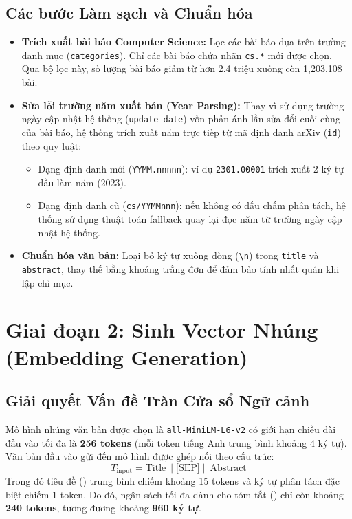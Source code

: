 \subsection{Các bước Làm sạch và Chuẩn hóa}
\begin{itemize}
    \item \textbf{Trích xuất bài báo Computer Science:} Lọc các bài báo dựa trên trường danh mục (\texttt{categories}). Chỉ các bài báo chứa nhãn \texttt{cs.*} mới được chọn. Qua bộ lọc này, số lượng bài báo giảm từ hơn 2.4 triệu xuống còn 1,203,108 bài.
    \item \textbf{Sửa lỗi trường năm xuất bản (Year Parsing):} Thay vì sử dụng trường ngày cập nhật hệ thống (\texttt{update\_date}) vốn phản ánh lần sửa đổi cuối cùng của bài báo, hệ thống trích xuất năm trực tiếp từ mã định danh arXiv (\texttt{id}) theo quy luật:
    \begin{itemize}
        \item Dạng định danh mới (\texttt{YYMM.nnnnn}): ví dụ \texttt{2301.00001} trích xuất 2 ký tự đầu làm năm (2023).
        \item Dạng định danh cũ (\texttt{cs/YYMMnnn}): nếu không có dấu chấm phân tách, hệ thống sử dụng thuật toán fallback quay lại đọc năm từ trường ngày cập nhật hệ thống.
    \end{itemize}
    \item \textbf{Chuẩn hóa văn bản:} Loại bỏ ký tự xuống dòng (\texttt{\textbackslash n}) trong \texttt{title} và \texttt{abstract}, thay thế bằng khoảng trắng đơn để đảm bảo tính nhất quán khi lập chỉ mục.
\end{itemize}

\section{Giai đoạn 2: Sinh Vector Nhúng (Embedding Generation)}

\subsection{Giải quyết Vấn đề Tràn Cửa sổ Ngữ cảnh}
Mô hình nhúng văn bản được chọn là \texttt{all-MiniLM-L6-v2} có giới hạn chiều dài đầu vào tối đa là \textbf{256 tokens} (mỗi token tiếng Anh trung bình khoảng 4 ký tự). Văn bản đầu vào gửi đến mô hình được ghép nối theo cấu trúc:
\begin{equation}
T_{\text{input}} = \text{Title} \mathbin{\parallel} \text{[SEP]} \mathbin{\parallel} \text{Abstract}
\end{equation}
Trong đó tiêu đề () trung bình chiếm khoảng 15 tokens và ký tự phân tách đặc biệt \text{[SEP]} chiếm 1 token. Do đó, ngân sách tối đa dành cho tóm tắt () chỉ còn khoảng \textbf{240 tokens}, tương đương khoảng \textbf{960 ký tự}.

